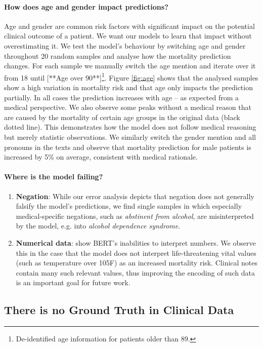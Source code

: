 \documentclass[11pt,a4paper]{article}
\begin{document}
\paragraph{How does age and gender impact predictions?} Age and gender are common risk factors with significant impact on the potential clinical outcome of a patient. We want our models to learn that impact without overestimating it. We test the model's behaviour by switching age and gender throughout 20 random samples and analyse how the mortality prediction changes. For each sample we manually switch the age mention and iterate over it from 18 until [**Age over 90**]\footnote{De-identified age information for patients older than 89.}. Figure \ref{fig:age} shows that the analysed samples show a high variation in mortality risk and that age only impacts the prediction partially. In all cases the prediction increases with age -- as expected from a medical perspective. We also observe some peaks without a medical reason that are caused by the mortality of certain age groups in the original data (black dotted line). This demonstrates how the model does not follow medical reasoning but merely statistic observations. We similarly switch the gender mention and all pronouns in the texts and observe that mortality prediction for male patients is increased by 5\% on average, consistent with medical rationale.

\paragraph{Where is the model failing?}  
\begin{enumerate}
    \item \textbf{Negation}: While our error analysis depicts that negation does not generally falsify the model's predictions, we find single samples in which especially medical-specific negations, such as \textit{\hbox{abstinent} from alcohol}, are misinterpreted by the model, e.g. into \textit{alcohol \hbox{dependence} syndrome}.
    \item \textbf{Numerical data}: \citet{bert-numbers} show BERT's inabilities to interpret numbers. We observe this in the case that the model does not interpret life-threatening vital values (such as temperature over 105F) as an increased mortality risk. Clinical notes contain many such relevant values, thus improving the encoding of such data is an important goal for future work.
\end{enumerate}

\subsection{There is no Ground Truth in Clinical Data}
\end{document}
